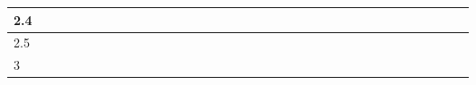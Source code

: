 \begin{table}[]
\begin{tabular}{|l|l|l|l|l|l|l|l|l|l|l|l|l|l|l|l|l|l|l|l|l|l|l|l|l|l|l|l|l|l|l|l|l|l|l|}
    2.4   &                                                 &                          &                          &                          &                          &                          &                          &                          &                          &                          &                          & \cellcolor[HTML]{000000} & \cellcolor[HTML]{000000} & \cellcolor[HTML]{000000} &                          &                          &                          &                          &                          & \cellcolor[HTML]{000000} &                          &                          &                          &                          &                          &                          &                          & \cellcolor[HTML]{000000} & \cellcolor[HTML]{000000} &                          &                          &                          &                          &                          \\ \hline
    2.5   & \cellcolor[HTML]{000000}                        &                          &                          &                          &                          &                          &                          &                          &                          &                          & \cellcolor[HTML]{000000} &                          &                          &                          &                          &                          &                          &                          &                          &                          &                          &                          &                          &                          &                          &                          &                          & \cellcolor[HTML]{000000} & \cellcolor[HTML]{000000} & \cellcolor[HTML]{000000} &                          &                          &                          &                          \\ \hline
    3     & \cellcolor[HTML]{000000}                        & \cellcolor[HTML]{000000} & \cellcolor[HTML]{000000} & \cellcolor[HTML]{000000} & \cellcolor[HTML]{000000} & \cellcolor[HTML]{000000} & \cellcolor[HTML]{000000} & \cellcolor[HTML]{000000} & \cellcolor[HTML]{000000} & \cellcolor[HTML]{000000} &                          & \cellcolor[HTML]{000000} & \cellcolor[HTML]{000000} & \cellcolor[HTML]{000000} &                          & \cellcolor[HTML]{000000} &                          &                          & \cellcolor[HTML]{000000} &                          &                          &                          &                          & \cellcolor[HTML]{000000} &                          &                          & \cellcolor[HTML]{000000} &                          & \cellcolor[HTML]{000000} &                          & \cellcolor[HTML]{000000} & \cellcolor[HTML]{000000} & \cellcolor[HTML]{000000} & \cellcolor[HTML]{000000} \\ \hline

\end{tabular}
\end{table}
